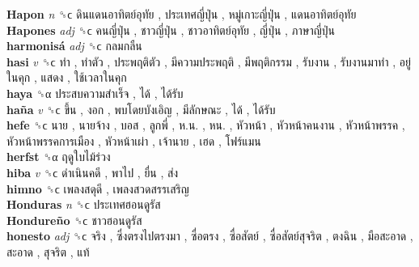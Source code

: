 \textbf{Hapon} \emph{n}  ␝ϲ   ดินแดนอาทิตย์อุทัย ,  ประเทศญี่ปุ่น ,  หมู่เกาะญี่ปุ่น ,  แดนอาทิตย์อุทัย   \\
\textbf{Hapones} \emph{adj}  ␝ϲ   คนญี่ปุ่น ,  ชาวญี่ปุ่น ,  ชาวอาทิตย์อุทัย ,  ญี่ปุ่น ,  ภาษาญี่ปุ่น   \\
\textbf{harmonisá} \emph{adj}  ␝ϲ   กลมกลืน   \\
\textbf{hasi} \emph{v}  ␝ϲ   ทำ ,  ทำตัว ,  ประพฤติตัว ,  มีความประพฤติ ,  มีพฤติกรรม ,  รับงาน ,  รับงานมาทำ ,  อยู่ในคุก ,  แสดง ,  ใช้เวลาในคุก   \\
\textbf{haya} ␝α   ประสบความสำเร็จ ,  ได้ ,  ได้รับ   \\
\textbf{haña} \emph{v}  ␝ϲ   ขึ้น ,  งอก ,  พบโดยบังเอิญ ,  มีลักษณะ ,  ได้ ,  ได้รับ   \\
\textbf{hefe} ␝ϲ   นาย ,  นายจ้าง ,  บอส ,  ลูกพี่ ,  ห.น. ,  หน. ,  หัวหน้า ,  หัวหน้าคนงาน ,  หัวหน้าพรรค ,  หัวหน้าพรรคการเมือง ,  หัวหน้าเผ่า ,  เจ้านาย ,  เฮด ,  โฟร์แมน   \\
\textbf{herfst} ␝α   ฤดูใบไม้ร่วง   \\
\textbf{hiba} \emph{v}  ␝ϲ   ดำเนินคดี ,  พาไป ,  ยื่น ,  ส่ง   \\
\textbf{himno} ␝ϲ   เพลงสดุดี ,  เพลงสวดสรรเสริญ   \\
\textbf{Honduras} \emph{n}  ␝ϲ   ประเทศฮอนดูรัส   \\
\textbf{Hondureño} ␝ϲ   ชาวฮอนดูรัส   \\
\textbf{honesto} \emph{adj}  ␝ϲ   จริง ,  ซึ่งตรงไปตรงมา ,  ซื่อตรง ,  ซื่อสัตย์ ,  ซื่อสัตย์สุจริต ,  ตงฉิน ,  มือสะอาด ,  สะอาด ,  สุจริต ,  แท้   \\
